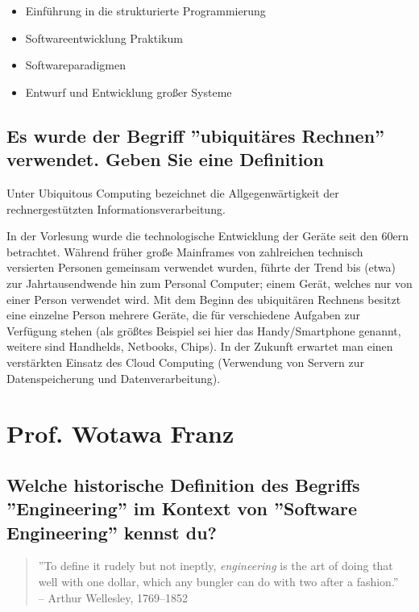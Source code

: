 \begin{itemize}
  \item Einführung in die strukturierte Programmierung
  \item Softwareentwicklung Praktikum
  \item Softwareparadigmen
  \item Entwurf und Entwicklung großer Systeme
\end{itemize}

\subsection{Es wurde der Begriff ''ubiquitäres Rechnen'' verwendet. Geben
    Sie eine Definition}

Unter Ubiquitous Computing bezeichnet die Allgegenwärtigkeit der
rechnergestützten Informationsverarbeitung.

In der Vorlesung wurde
die technologische Entwicklung der Geräte seit den 60ern betrachtet.
Während früher große Mainframes von zahlreichen technisch versierten
Personen gemeinsam verwendet wurden, führte der Trend bis (etwa) zur
Jahrtausendwende hin zum Personal Computer; einem Gerät, welches nur
von einer Person verwendet wird. Mit dem Beginn des ubiquitären Rechnens
besitzt eine einzelne Person mehrere Geräte, die für verschiedene Aufgaben
zur Verfügung stehen (als größtes Beispiel sei hier das Handy/Smartphone
genannt, weitere sind Handhelds, Netbooks, Chips). In der Zukunft
erwartet man einen verstärkten Einsatz des Cloud Computing (Verwendung
von Servern zur Datenspeicherung und Datenverarbeitung).

\section{Prof. Wotawa Franz}

\subsection{Welche historische Definition des Begriffs ''Engineering'' im
    Kontext von ''Software Engineering'' kennst du?}

\begin{quote}
    ''To define it rudely but not ineptly,
    \emph{engineering} is the art of doing
    that well with one dollar,
    which any bungler can do with
    two after a fashion.'' \\
    -- Arthur Wellesley, 1769--1852
\end{quote}

